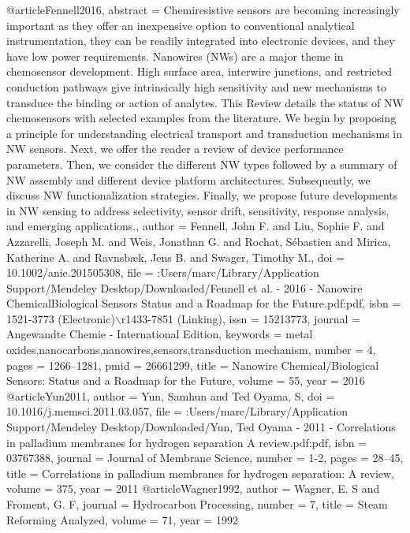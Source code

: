@article{Fennell2016,
abstract = {Chemiresistive sensors are becoming increasingly important as they offer an inexpensive option to conventional analytical instrumentation, they can be readily integrated into electronic devices, and they have low power requirements. Nanowires (NWs) are a major theme in chemosensor development. High surface area, interwire junctions, and restricted conduction pathways give intrinsically high sensitivity and new mechanisms to transduce the binding or action of analytes. This Review details the status of NW chemosensors with selected examples from the literature. We begin by proposing a principle for understanding electrical transport and transduction mechanisms in NW sensors. Next, we offer the reader a review of device performance parameters. Then, we consider the different NW types followed by a summary of NW assembly and different device platform architectures. Subsequently, we discuss NW functionalization strategies. Finally, we propose future developments in NW sensing to address selectivity, sensor drift, sensitivity, response analysis, and emerging applications.},
author = {Fennell, John F. and Liu, Sophie F. and Azzarelli, Joseph M. and Weis, Jonathan G. and Rochat, S{\'{e}}bastien and Mirica, Katherine A. and Ravnsb{\ae}k, Jens B. and Swager, Timothy M.},
doi = {10.1002/anie.201505308},
file = {:Users/marc/Library/Application Support/Mendeley Desktop/Downloaded/Fennell et al. - 2016 - Nanowire ChemicalBiological Sensors Status and a Roadmap for the Future.pdf:pdf},
isbn = {1521-3773 (Electronic)$\backslash$r1433-7851 (Linking)},
issn = {15213773},
journal = {Angewandte Chemie - International Edition},
keywords = {metal oxides,nanocarbons,nanowires,sensors,transduction mechanism},
number = {4},
pages = {1266--1281},
pmid = {26661299},
title = {{Nanowire Chemical/Biological Sensors: Status and a Roadmap for the Future}},
volume = {55},
year = {2016}
}
@article{Yun2011,
author = {Yun, Samhun and {Ted Oyama}, S},
doi = {10.1016/j.memsci.2011.03.057},
file = {:Users/marc/Library/Application Support/Mendeley Desktop/Downloaded/Yun, Ted Oyama - 2011 - Correlations in palladium membranes for hydrogen separation A review.pdf:pdf},
isbn = {03767388},
journal = {Journal of Membrane Science},
number = {1-2},
pages = {28--45},
title = {{Correlations in palladium membranes for hydrogen separation: A review}},
volume = {375},
year = {2011}
}
@article{Wagner1992,
author = {Wagner, E. S and Froment, G. F},
journal = {Hydrocarbon Processing},
number = {7},
title = {{Steam Reforming Analyzed}},
volume = {71},
year = {1992}
}
